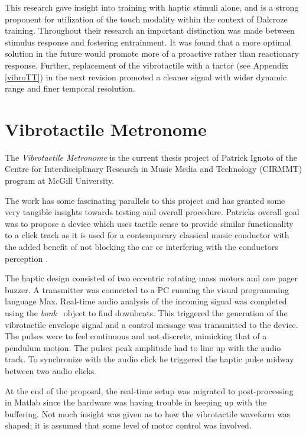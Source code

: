 This research gave insight into training with haptic stimuli alone, and is a strong proponent for utilization of the touch modality within the context of Dalcroze training. Throughout their research an important distinction was made between stimulus response and fostering entrainment. It was found that a more optimal solution in the future would promote more of a proactive rather than reactionary response. Further, replacement of the vibrotactile with a tactor (see Appendix \ref{vibroTT}) in the next revision promoted a cleaner signal with wider dynamic range and finer temporal resolution.

\section{Vibrotactile Metronome} \label{vibrotactileMetronome}
The \textit{Vibrotactile Metronome} is the current thesis project of Patrick Ignoto of the Centre for Interdisciplinary Research in Music Media and Technology (CIRMMT) program at McGill University.

The work has some fascinating parallels to this project and has granted some very tangible insights towards testing and overall procedure. Patrick\textsc{}s overall goal was to propose a device which uses tactile sense to provide similar functionality to a click track as it is used for a contemporary classical music conductor with the added benefit of not blocking the ear or interfering with the conductor\textsc{}s perception \cite{ignoto2017development}.

The haptic design consisted of two eccentric rotating mass motors and one pager buzzer. A transmitter was connected to a PC running the visual programming language Max. Real-time audio analysis of the incoming signal was completed using the \textit{bonk~} object to find downbeats. This triggered the generation of the vibrotactile envelope signal and a control message was transmitted to the device. The pulses were to feel continuous and not discrete, mimicking that of a pendulum motion. The pulse\textsc{}s peak amplitude had to line up with the audio track. To synchronize with the audio click he triggered the haptic pulse midway between two audio clicks.

At the end of the proposal, the real-time setup was migrated to post-processing in Matlab since the hardware was having trouble in keeping up with the buffering. Not much insight was given as to how the vibrotactile waveform was shaped; it is assumed that some level of motor control was involved.

